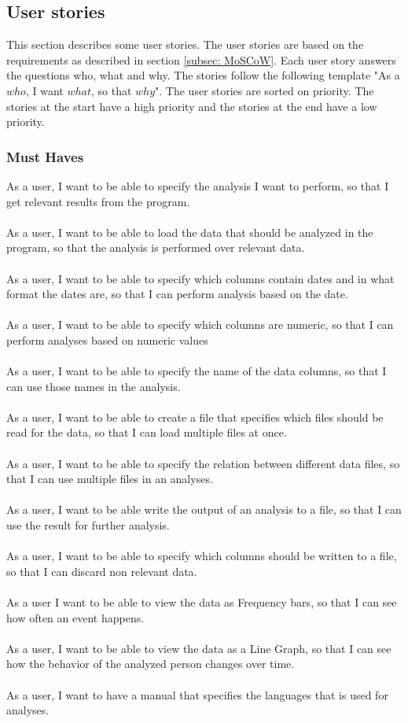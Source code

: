 \subsection{User stories}
\label{subsec:User-stories}
This section describes some user stories. The user stories are based on the requirements as described in section \ref{subsec: MoSCoW}. Each user story answers the questions who, what and why. The stories follow the following template "As a $who$, I want $what$, so that $why$". The user stories are sorted on priority. The stories at the start have a high priority and the stories at the end have a low priority.
\subsubsection{Must Haves}
As a user, I want to be able to specify the analysis I want to perform, so that I get relevant results from the program. 
\\\\
As a user, I want to be able to load the data that should be analyzed in the program, so that the analysis is performed over relevant data. 
\\\\
As a user, I want to be able to specify which columns contain dates and in what format the dates are, so that I can perform analysis based on the date.
\\\\
As a user, I want to be able to specify which columns are numeric, so that I can perform analyses based on numeric values
\\\\
As a user, I want to be able to specify the name of the data columns, so that I can use those names in the analysis.
\\\\
As a user, I want to be able to create a file that specifies which files should be read for the data, so that I can load multiple files at once.
\\\\
As a user, I want to be able to specify the relation between different data files, so that I can use multiple files in an analyses.
\\\\
As a user, I want to be able write the output of an analysis to a file, so that I can use the result for further analysis.
\\\\
As a user, I want to be able to specify which columns should be written to a file, so that I can discard non relevant data.
\\\\
As a user I want to be able to view the data as Frequency bars, so that I can see how often an event happens.
\\\\
As a user, I want to be able to view the data as a Line Graph, so that I can see how the behavior of the analyzed person changes over time.
\\\\
As a user, I want to have a manual that specifies the languages that is used for analyses.


